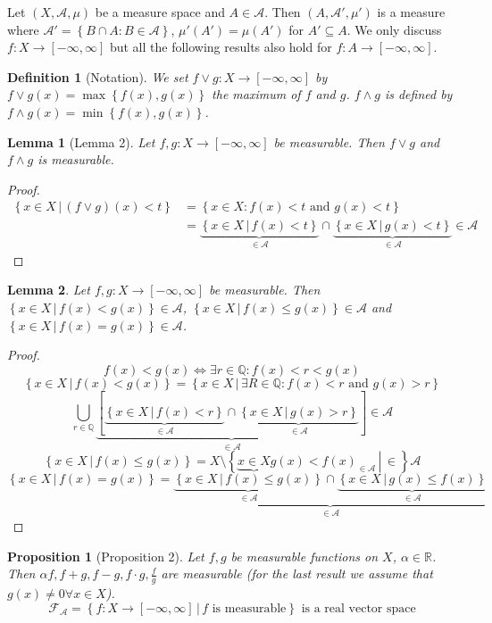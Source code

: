 \documentclass{article}
\newtheorem{definition}{Definition}  \numberwithin{definition}{section}
\newtheorem{lemma}{Lemma}  \numberwithin{lemma}{section}
\newtheorem{proposition}{Proposition}  \numberwithin{proposition}{section}
\newcommand{\set}[1]{\left\{#1\right\}}
\newcommand{\setdef}[2]{\left\{\left.#1\,\right|\,#2\right\}}
\begin{document}
Let $(X, \mathcal A, \mu)$ be a measure space and $A \in \mathcal A$. Then $(A, \mathcal A', \mu')$ is a measure where $\mathcal A' = \set{B \cap A: B \in \mathcal A}$,
$\mu'(A') = \mu(A')$ for $A' \subseteq A$. We only discuss $f: X \to [-\infty, \infty]$ but all the following results also hold for $f: A \to [-\infty, \infty]$.

\begin{definition}[Notation]
  We set $f \lor g: X \to [-\infty, \infty]$ by $f \lor g(x) = \max\set{f(x), g(x)}$ the maximum of $f$ and $g$.
  $f \land g$ is defined by $f \land g(x) = \min\set{f(x), g(x)}$.
\end{definition}
\begin{lemma}[Lemma 2]
  Let $f, g: X \to [-\infty, \infty]$ be measurable. Then $f \lor g$ and $f \land g$ is measurable.
\end{lemma}
\begin{proof}
  \begin{align*}
    \setdef{x \in X}{(f \lor g)(x) < t}
      &= \set{x \in X: f(x) < t \text{ and } g(x) < t} \\
      &= \underbrace{\setdef{x \in X}{f(x) < t}}_{\in \mathcal A} \cap \underbrace{\setdef{x \in X}{g(x) < t}}_{\in \mathcal A} \in \mathcal A
  \end{align*}
\end{proof}
\begin{lemma} %
  Let $f, g: X \to [-\infty, \infty]$ be measurable. Then $\setdef{x \in X}{f(x) < g(x)} \in \mathcal A$,
  $\setdef{x \in X}{f(x) \leq g(x)} \in \mathcal A$ and $\setdef{x \in X}{f(x) = g(x)} \in \mathcal A$.
\end{lemma}
\begin{proof}
  \[ f(x) < g(x) \Leftrightarrow \exists r \in \mathbb Q: f(x) < r < g(x) \]
  \[ \setdef{x \in X}{f(x) < g(x)} = \setdef{x \in X}{\exists R \in \mathbb Q: f(x) < r \text{ and } g(x) > r}  \]
  \[ \bigcup_{r \in \mathbb Q} \underbrace{\left[\underbrace{\setdef{x \in X}{f(x) < r}}_{\in \mathcal A} \cap \underbrace{\setdef{x \in X}{g(x) > r}}_{\in \mathcal A}\right]}_{\in \mathcal A} \in \mathcal A \]
  \[ \setdef{x \in X}{f(x) \leq g(x)} = X \setminus \setdef{\underbrace{x \in X}{g(x) < f(x)}_{\in \mathcal A}} \in \mathcal A \]
  \[ \setdef{x \in X}{f(x) = g(x)} = \underbrace{\underbrace{\setdef{x \in X}{f(x) \leq g(x)}}_{\in \mathcal A} \cap \underbrace{\setdef{x \in X}{g(x) \leq f(x)}}_{\in \mathcal A}}_{\in \mathcal A} \]
\end{proof}
\begin{proposition}[Proposition 2]
  Let $f, g$ be measurable functions on $X$, $\alpha \in \mathbb R$.
  Then $\alpha f, f + g, f - g, f \cdot g, \frac{f}{g}$ are measurable (for the last result we assume that $g(x) \neq 0 \forall x \in X$).
  \[ \mathcal F_{\mathcal A} = \setdef{f: X \to [-\infty, \infty]}{f \text{ is measurable}} \text{ is a real vector space} \]
\end{proposition}
\end{document}
